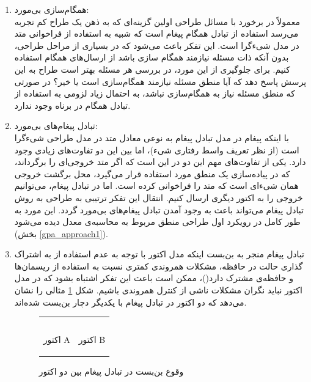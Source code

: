 \begin{enumerate}
\item همگام‌سازی بی‌مورد:\\
معمولاً در برخورد با مسائل طراحی اولین گزینه‌ای که به ذهن یک طراح کم تجربه می‌رسد استفاده از تبادل همگام پیغام است که شبیه به استفاده از فراخوانی متد در مدل شیءگرا است. این تفکر باعث می‌شود که در بسیاری از مراحل طراحی، بدون آنکه ذات مسئله نیازمند همگام سازی باشد از ارسال‌های همگام استفاده کنیم. برای جلوگیری از این مورد، در بررسی هر مسئله بهتر است طراح به این پرسش پاسخ دهد که آیا منطق مسئله نیازمند همگام‌سازی است یا خیر؟ در صورتی که منطق مسئله نیاز به همگام‌سازی نباشد، به احتمال زیاد لزومی به استفاده از تبادل همگام در برناه وجود ندارد.

\item تبادل پیغام‌های بی‌مورد:\\
 با اینکه پیغام در مدل تبادل پیغام به نوعی معادل متد در مدل طراحی شیءگرا است (از نظر تعریف واسط رفتاری شیء)، اما بین این دو تفاوت‌های زیادی وجود دارد. یکی از تفاوت‌های مهم این دو در این است که اگر متد خروجی‌ای را برگرداند، که در پیاده‌سازی یک منطق مورد استفاده قرار می‌گیرد، محل برگشت خروجی همان شی‌ءای است که متد را فراخوانی کرده است. اما در تبادل پیغام،‌ می‌توانیم خروجی را به اکتور دیگری ارسال کنیم. انتقال این تفکر ترتیبی به طراحی به روش تبادل پیغام می‌تواند باعث به وجود آمدن تبادل پیغام‌های بی‌مورد گردد. این مورد به طور کامل در رویکرد اول طراحی منطق مربوط به محاسبه‌ی معدل دیده می‌شود (بخش \ref{gpa_approach1}). 
 
 \item تبادل پیغام منجر به بن‌بست
 اینکه مدل اکتور با توجه به عدم استفاده از به اشتراک گذاری حالت در حافظه، مشکلات همروندی کمتری نسبت به استفاده از ریسمان‌ها و حافظه‌ی مشترک دارد(\cite{WhyThreadsAreABadIdea})، ممکن است باعث این تفکر اشتباه بشود که در مدل اکتور نباید نگران مشکلات ناشی از کنترل همروندی باشیم. شکل \ref{fig:deadlock1} مثالی را نشان می‌دهد که دو اکتور در تبادل پیغام با یکدیگر دچار بن‌بست شده‌اند.
\begin{figure}
    \begin{center}
    \begin{tabular}{|m{6cm}|m{6cm}|}
      	\hline
	 & \\
	\begin{latin}
\linespread{1.1}

\end{latin} & 
 \begin{latin}
	\linespread{1.1}
		
\end{latin}
 	\\
	\begin{center}اکتور A\end{center}       &  \begin{center} اکتور B\end{center}            \\
	\hline
    \end{tabular}
    \end{center}
    \caption{\label{fig:deadlock1}  وقوع بن‌بست در تبادل پیغام بین دو اکتور}
\end{figure}


\end{enumerate}
